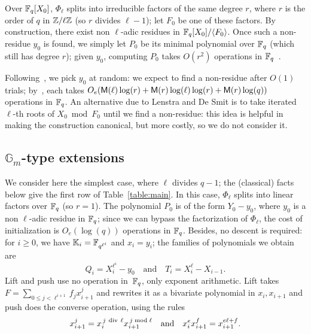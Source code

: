 \documentclass{sig-alternate}
\newcommand{\Cyc}{\Phi}  %
\begin{document}
Over $\mathbb{F}_q[X_0]$, $\Cyc_\ell$ splits into irreducible factors of the
same degree $r$, where $r$ is the order of $q$ in $\mathbb{Z}/\ell\mathbb{Z}$ (so $r$
divides $\ell-1$); let $F_0$ be one of these factors. By construction,
there exist non $\ell$-adic residues in $\mathbb{F}_q[X_0]/\langle F_0
\rangle$. Once such a non-residue $y_0$ is found, we simply let $P_0$
be its minimal polynomial over $\mathbb{F}_q$ (which still has degree $r$);
given $y_0$, computing $P_0$ takes $O(r^2)$ operations in
$\mathbb{F}_q$~\cite[Th.~4]{shoup94}.

Following~\cite{Shoup90,shoup94,couveignes+lercier11}, we pick $y_0$
at random: we expect to find a non-residue after $O(1)$ trials;
by~\cite[Lemma~15]{shoup94}, each takes
$O_e(\mathsf{M}(\ell)\log(r)+\mathsf{M}(r)\log(\ell)\log(r)+\mathsf{M}(r)\log(q))$
operations in $\mathbb{F}_q$. An alternative due to Lenstra and De Smit is to
take iterated $\ell$-th roots of $X_0 \bmod F_0$ until we find a
non-residue: this idea is helpful in making the construction
canonical, but more costly, so we do not consider it.


\subsection{$\mathbb{G}_m$-type extensions}\label{ssec:T1}


We consider here the simplest case, where $\ell$ divides $q-1$; the
(classical) facts below give the first row of Table~\ref{table:main}.
In this case, $\Phi_\ell$ splits into linear factors over $\mathbb{F}_q$ (so
$r=1$). The polynomial $P_0$ is of the form $Y_0-y_0$, where $y_0$ is
a non $\ell$-adic residue in $\mathbb{F}_q$; since we can bypass the
factorization of $\Phi_\ell$, the cost of initialization is
$O_e(\log(q))$ operations in $\mathbb{F}_q$. Besides, no descent is required:
for $i \ge 0$, we have $\mathbb{K}_i=\mathbb{F}_{q^{\ell^i}}$ and $x_i=y_i$; the
families of polynomials we obtain are
\begin{equation}
  \label{eq:T1}
  Q_i=X_i^{\ell^i}-y_0 \quad\text{and}\quad T_i=X_{i}^\ell-X_{i-1}.
\end{equation}
Lift and push use no operation in~$\mathbb{F}_q$, only exponent
arithmetic. Lift takes $F = \sum_{0 \le j < \ell^{i+1}}
f_j x_{i+1}^j$ and rewrites it as a bivariate polynomial in
$x_i,x_{i+1}$ and push does  the converse operation, 
using the rules
$$x_{i+1}^j = x_i^{\,j {\rm~div~} \ell} x_{i+1}^{\,j \bmod \ell}
\quad\text{and}\quad
x_i^e x_{i+1}^f = x_{i+1}^{e \ell + f}.$$ 
\end{document}
